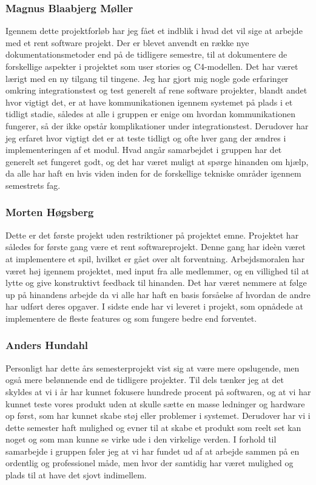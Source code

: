 \subsubsection{Magnus Blaabjerg Møller}
Igennem dette projektforløb har jeg fået et indblik i hvad det vil sige at arbejde med et rent software projekt. Der er blevet anvendt en række nye dokumentationsmetoder end på de tidligere semestre, til at dokumentere de forskellige aspekter i projektet som user stories og C4-modellen. Det har været lærigt med en ny tilgang til tingene. Jeg har gjort mig nogle gode erfaringer omkring integrationstest og test generelt af rene software projekter, blandt andet hvor vigtigt det, er at have kommunikationen igennem systemet på plads i et tidligt stadie, således at alle i gruppen er enige om hvordan kommunikationen fungerer, så der ikke opstår komplikationer under integrationstest. Derudover har jeg erfaret hvor vigtigt det er at teste tidligt og ofte hver gang der ændres i implementeringen af et modul. Hvad angår samarbejdet i gruppen har det generelt set fungeret godt, og det har været muligt at spørge hinanden om hjælp, da alle har haft en hvis viden inden for de forskellige tekniske områder igennem semestrets fag.\\

\subsubsection{Morten Høgsberg}
Dette er det første projekt uden restriktioner på projektet emne. Projektet har således for første gang
være et rent softwareprojekt. Denne gang har ideèn været at implementere et spil, hvilket er gået over
alt forventning. Arbejdsmoralen har været høj igennem projektet, med input fra alle medlemmer, og en
villighed til at lytte og give konstruktivt feedback til hinanden.
Det har været nemmere at følge up på hinandens arbejde da vi alle har haft en basis forsåelse af hvordan 
de andre har udført deres opgaver. I sidste ende har vi leveret i projekt, som opnådede at implementere
de fleste features og som fungere bedre end forventet. 

\subsubsection{Anders Hundahl}
Personligt har dette års semesterprojekt vist sig at være mere opslugende, men også mere belønnende end de tidligere projekter. Til dels tænker jeg at det skyldes at vi i år har kunnet fokusere hundrede procent på softwaren, og at vi har kunnet teste vores produkt uden at skulle sætte en masse ledninger og hardware op først, som har kunnet skabe støj eller problemer i systemet. Derudover har vi i dette semester haft mulighed og evner til at skabe et produkt som reelt set kan noget og som man kunne se virke ude i den virkelige verden. I forhold til samarbejde i gruppen føler jeg at vi har fundet ud af at arbejde sammen på en ordentlig og professionel måde, men hvor der samtidig har været mulighed og plads til at have det sjovt indimellem.

